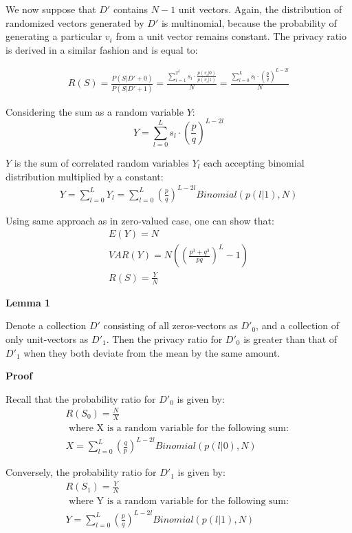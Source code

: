\documentclass[11pt,draft]{article}
\begin{document}
We now suppose that $D'$ contains $N-1$ unit vectors.  Again, the distribution of randomized vectors generated by $D'$ is multinomial, because the probability of generating a particular $v_i$ from a unit vector remains constant.
The privacy ratio is derived in a similar fashion and is equal to:
 
\begin{align}
R(S) = \frac{P(S|D'+0)}{P(S|D'+1)} =  \frac {  \sum_{i=1}^{2^L} s_i  \cdot \frac{p(v_i|0)}{p(v_i|1)}  } {N} = \frac{ \sum_{l=0}^{L} s_l \cdot  \left ( \frac{p}{q} \right )^ {L - 2l}  }{ N}
\end{align}

Considering the sum as a random variable $Y$:
\[
Y = \sum_{l=0}^{L} s_l \cdot  \left ( \frac{p}{q} \right )^ {L - 2l} 
\]

 $Y$ is the sum of correlated random variables $Y_l$ each accepting binomial distribution multiplied by a constant:
 \begin{align}
 Y =  \sum_{l=0}^{L} Y_l  =  \sum_{l=0}^{L}   \left ( \frac{p}{q} \right )^ {L - 2l}  Binomial(p(l|1), N)
\end{align} 

Using same approach as in zero-valued case, one can show that:
 \begin{align}
E(Y) = N \\
VAR(Y) =  N   \left (  \left ( \frac{p^3 + q^3}{pq} \right )^L - 1 \right ) \\
R(S) =   \frac{Y}{ N}
\end{align}

\textbf{Lemma 1}

Denote a collection $D'$ consisting of all zeros-vectors as $D'_0$, and a collection of only unit-vectors as $D'_1$.
Then the privacy ratio for $D'_0$  is greater than that of $D'_1$ when they both deviate from the mean by the same amount.

\textbf{Proof}

Recall that the probability ratio for $D'_0$ is given by:
\begin{align}
R(S_0) =  \frac{N}{X}  \\
\text{ where X is a random variable for the following sum:   }\\ 
X =  \sum_{l=0}^{L}   \left ( \frac{q}{p} \right )^ {L - 2l}  Binomial(p(l|0), N)
\end{align}

Conversely, the probability ratio for $D'_1$ is given by:
\begin{align}
R(S_1) =  \frac{Y}{N}  \\
\text{ where Y is a random variable for the following sum:   } \\
Y =  \sum_{l=0}^{L}   \left ( \frac{p}{q} \right )^ {L - 2l}  Binomial(p(l|1), N)
\end{align}
\end{document}
